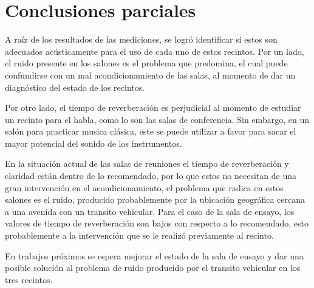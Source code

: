 \section{Conclusiones parciales}
A raíz de los resultados de las mediciones, se logró identificar si estos son adecuados acústicamente para el uso de cada uno de estos recintos. Por un lado, el ruido presente en los salones es el problema que predomina, el cual puede confundirse con un mal acondicionamiento de las salas, al momento de dar un diagnóstico del estado de los recintos.

Por otro lado, el tiempo de reverberación es perjudicial al momento de estudiar un recinto para el habla, como lo son las salas de conferencia. Sin embargo, en un salón para practicar musica clásica, este se puede utilizar a favor para sacar el mayor potencial del sonido de los instrumentos. 

En la situación actual de las salas de reuniones el tiempo de reverberación y claridad están dentro de lo recomendado, por lo que estos no necesitan de una gran intervención en el acondicionamiento, el problema que radica en estos salones es el ruido, producido probablemente por la ubicación geográfica cercana a una avenida con un transito vehicular. Para el caso de la sala de ensayo, los valores de tiempo de reverberación son bajos con respecto a lo recomendado, esto probablemente a la intervención que se le realizó previamente al recinto.

En trabajos próximos se espera mejorar el estado de la sala de ensayo y dar una posible solución al problema de ruido producido por el transito vehicular en los tres recintos.
